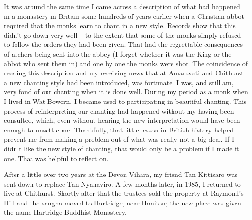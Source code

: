 It was around the same time I came across a description of what had
happened in a monastery in Britain some hundreds of years earlier when a
Christian abbot required that the monks learn to chant in a new style.
Records show that this didn't go down very well -- to the extent that
some of the monks simply refused to follow the orders they had been
given. That had the regrettable consequences of archers being sent into
the abbey (I forget whether it was the King or the abbot who sent them
in) and one by one the monks were shot. The coincidence of reading this
description and my receiving news that at Amaravati and Chithurst a new
chanting style had been introduced, was fortunate. I was, and still am,
very fond of our chanting when it is done well. During my period as a
monk when I lived in Wat Boworn, I became used to participating in
beautiful chanting. This process of reinterpreting our chanting had
happened without my having been consulted, which, even without hearing
the new interpretation would have been enough to unsettle me.
Thankfully, that little lesson in British history helped prevent me from
making a problem out of what was really not a big deal. If I didn't like
the new style of chanting, that would only be a problem if I made it
one. That was helpful to reflect on.

After a little over two years at the Devon Vihara, my friend Tan
Kittisaro was sent down to replace Tan Nyanaviro. A few months later, in
1985, I returned to live at Chithurst. Shortly after that the trustees
sold the property at Raymond's Hill and the sangha moved to Hartridge,
near Honiton; the new place was given the name
Hartridge Buddhist Monastery\cite{hartridge}.

